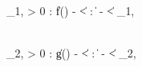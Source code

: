 \forall\;  \;\exists\; \delta_{1, \epsilon} > 0 :
\|f() - \| < 
\;\forall\;  : \| - \| < \delta_{1, \epsilon}

\\

\forall\;  \;\exists\; \delta_{2, \epsilon} > 0 :
\|g() - \| <  \;\forall\;
 : \| - \| < \delta_{2, \epsilon}